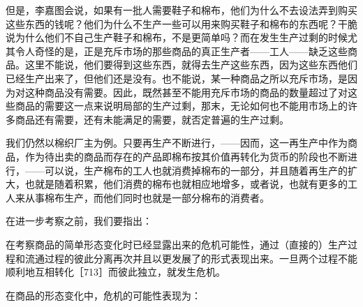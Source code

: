 但是，李嘉图会说，如果有一批人需要鞋子和棉布，他们为什么不去设法弄到购买这些东西的钱呢？他们为什么不生产一些可以用来购买鞋子和棉布的东西呢？干脆说为什么他们不自己生产鞋子和棉布，不是更简单吗？而在发生生产过剩的时候尤其令人奇怪的是，正是充斥市场的那些商品的真正生产者——工人——缺乏这些商品。这里不能说，他们要得到这些东西，就得去生产这些东西，因为这些东西他们已经生产出来了，但他们还是没有。也不能说，某一种商品之所以充斥市场，是因为对这种商品没有需要。因此，既然甚至不能用充斥市场的商品的数量超过了对这些商品的需要这一点来说明局部的生产过剩，那末，无论如何也不能用市场上的许多商品还有需要，还有未能满足的需要，就否定普遍的生产过剩。

我们仍然以棉织厂主为例。只要再生产不断进行，——因而，这一再生产中作为商品，作为待出卖的商品而存在的产品即棉布按其价值再转化为货币的阶段也不断进行，——可以说，生产棉布的工人也就消费掉棉布的一部分，并且随着再生产的扩大，也就是随着积累，他们消费的棉布也就相应地增多，或者说，也就有更多的工人来从事棉布生产，而他们同时也就是一部分棉布的消费者。


在进一步考察之前，我们要指出：

在考察商品的简单形态变化时已经显露出来的危机可能性，通过（直接的）生产过程和流通过程的彼此分离再次并且以更发展了的形式表现出来。一旦两个过程不能顺利地互相转化［713］而彼此独立，就发生危机。

在商品的形态变化中，危机的可能性表现为：

